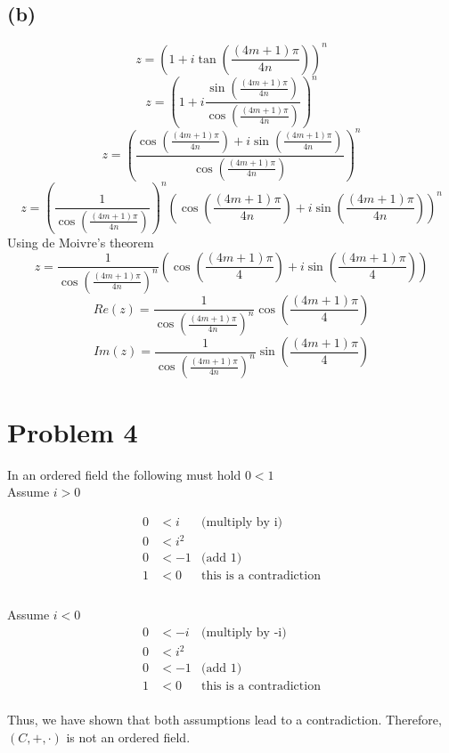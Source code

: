\documentclass{article}
\begin{document}
\subsection*{(b)}

\[
   z = \left(1 + i \tan\left(\frac{(4m + 1)\pi}{4n}\right)\right)^n
\]
\[
   z = \left(1 + i \frac{\sin\left(\frac{(4m + 1)\pi}{4n}\right)}{\cos\left(\frac{(4m + 1)\pi}{4n}\right)}\right)^n
\]
\[
   z = \left(\frac{ \cos\left(\frac{(4m + 1)\pi}{4n}\right)  + i\sin\left(\frac{(4m + 1)\pi}{4n}\right)  }{\cos\left(\frac{(4m + 1)\pi}{4n}\right)}\right)^n
\]
\[
   z = \left(\frac{1}{\cos\left(\frac{(4m + 1)\pi}{4n}\right)}\right)^n \left(\cos\left(\frac{(4m + 1)\pi}{4n}\right) + i\sin\left(\frac{(4m + 1)\pi}{4n}\right)\right)^n
\]
Using de Moivre's theorem
\[
   z = \frac{1}{\cos\left(\frac{(4m + 1)\pi}{4n}\right)^n} \left(\cos\left(\frac{(4m + 1)\pi}{4}\right) + i\sin\left(\frac{(4m + 1)\pi}{4}\right)\right)
\]
\[
   Re(z) = \frac{1}{\cos\left(\frac{(4m + 1)\pi}{4n}\right)^n} \cos\left(\frac{(4m + 1)\pi}{4}\right)
\]
\[
   Im(z) = \frac{1}{\cos\left(\frac{(4m + 1)\pi}{4n}\right)^n} \sin\left(\frac{(4m + 1)\pi}{4}\right)
\]

\section*{Problem 4}

In an ordered field the following must hold \(0 < 1\) \\
Assume \(i > 0\)

\begin{align*}
   0 &< i & \text{(multiply by i)}\\
   0 &< i^2 & \text{}\\
   0 &< -1 & \text{(add 1)}\\
   1 &< 0 & \text{this is a contradiction}\\
\end{align*}
\\
Assume \(i < 0\)
\begin{align*}
   0 &< -i & \text{(multiply by -i)}\\
   0 &< i^2 & \text{}\\
   0 &< -1 & \text{(add 1)}\\
   1 &< 0 & \text{this is a contradiction}\\
\end{align*}

Thus, we have shown that both assumptions lead to a contradiction. Therefore, \((C, +, \cdot)\) is not an ordered field.
\end{document}
